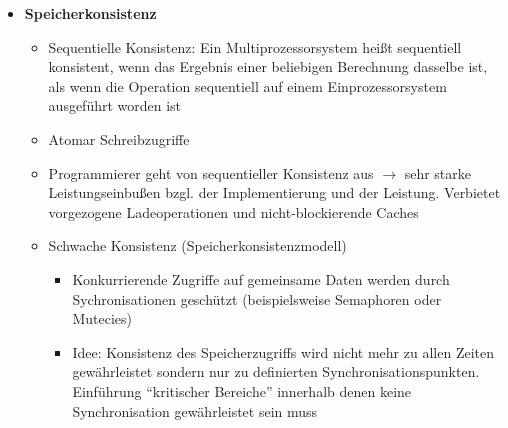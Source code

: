 \begin{itemize}
\begin{itemize}
\begin{itemize}
\begin{itemize}
				\item Modified (M): Der Speicherblock existiert nur lokal und ist nach dem Laden verändert worden. Bei einem externen Zugriff durch einen anderen Prozessor muss dieser in den Hauptspeicher zurückkopiert werden. Der externe Prozessor wird über das Retry-Signal informiert, dass zunächst zurückgeschrieben werden muss
			\end{itemize}
			\item Zustandsgraphen und Beispiel in den Folien\footnote{VL-07 Folie 2-40 bis 2-47}
		\end{itemize}
		\item Distributed Shared Memory
		\begin{itemize}
			\item Multiprozessor mit verteiltem, gemeinsamem Speicher ohne Möglichkeit, die Broadcasteigenschaft des Busses zu nutzen
			\item Verzeichnisbasierte, tabellenartige Cache-Kohärenzprotokolle, die in Hardware oder Software implementiert sein können
			\item Die Tabelle protokolliert für jeden Block im loken Speicher, ob dieser in den lokalen oder einen entfernten Cache-Speicher übertragen worden ist und hält die Zustände als Kopien
			\item Zustände werden ähnlich denen des MESI-Protokolls definiert
		\end{itemize}
	\end{itemize}
	\item \textbf{Speicherkonsistenz}
	\begin{itemize}
		\item Sequentielle Konsistenz: Ein Multiprozessorsystem heißt sequentiell konsistent, wenn das Ergebnis einer beliebigen Berechnung dasselbe ist, als wenn die Operation sequentiell auf einem Einprozessorsystem ausgeführt worden ist
		\item Atomar Schreibzugriffe
		\item Programmierer geht von sequentieller Konsistenz aus \(\rightarrow\) sehr starke Leistungseinbußen bzgl. der Implementierung und der Leistung. Verbietet vorgezogene Ladeoperationen und nicht-blockierende Caches
		\item Schwache Konsistenz (Speicherkonsistenzmodell)
		\begin{itemize}
			\item Konkurrierende Zugriffe auf gemeinsame Daten werden durch Sychronisationen geschützt (beispielsweise Semaphoren oder Mutecies)
			\item Idee: Konsistenz des Speicherzugriffs wird nicht mehr zu allen Zeiten gewährleistet sondern nur zu definierten Synchronisationspunkten. Einführung "`kritischer Bereiche"' innerhalb denen keine Synchronisation gewährleistet sein muss

\end{itemize}
\end{itemize}
\end{itemize}
